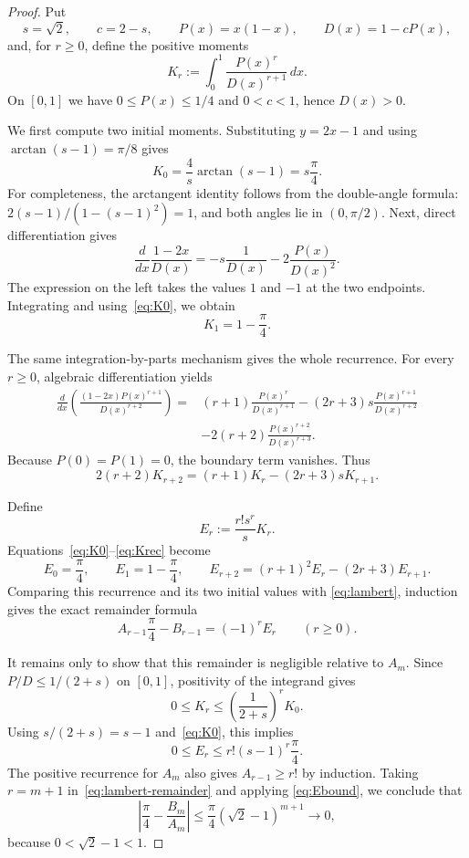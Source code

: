\documentclass[11pt]{article}
\theoremstyle{remark}
\begin{document}
\begin{proof}
Put
\[
s=\sqrt2,\qquad c=2-s,\qquad P(x)=x(1-x),\qquad D(x)=1-cP(x),
\]
and, for $r\ge0$, define the positive moments
\begin{equation}\label{eq:moment}
K_r:=\int_0^1\frac{P(x)^r}{D(x)^{r+1}}\,dx.
\end{equation}
On $[0,1]$ we have $0\le P(x)\le1/4$ and $0<c<1$, hence $D(x)>0$.

We first compute two initial moments. Substituting $y=2x-1$ and using
$\arctan(s-1)=\pi/8$ gives
\begin{equation}\label{eq:K0}
K_0=\frac4s\arctan(s-1)=s\frac{\pi}{4}.
\end{equation}
For completeness, the arctangent identity follows from the double-angle
formula: $2(s-1)/(1-(s-1)^2)=1$, and both angles lie in $(0,\pi/2)$.
Next, direct differentiation gives
\[
\frac{d}{dx}\frac{1-2x}{D(x)}
=-s\frac1{D(x)}-2\frac{P(x)}{D(x)^2}.
\]
The expression on the left takes the values $1$ and $-1$ at the two
endpoints. Integrating and using~\eqref{eq:K0}, we obtain
\begin{equation}\label{eq:K1}
K_1=1-\frac{\pi}{4}.
\end{equation}

The same integration-by-parts mechanism gives the whole recurrence. For every
$r\ge0$, algebraic differentiation yields
\begin{align*}
\frac{d}{dx}\left(
  \frac{(1-2x)P(x)^{r+1}}{D(x)^{r+2}}
\right)
={}&(r+1)\frac{P(x)^r}{D(x)^{r+1}}
 -(2r+3)s\frac{P(x)^{r+1}}{D(x)^{r+2}}\\
&-2(r+2)\frac{P(x)^{r+2}}{D(x)^{r+3}}.
\end{align*}
Because $P(0)=P(1)=0$, the boundary term vanishes. Thus
\begin{equation}\label{eq:Krec}
2(r+2)K_{r+2}=(r+1)K_r-(2r+3)sK_{r+1}.
\end{equation}

Define
\[
E_r:=\frac{r!s^r}{s}K_r.
\]
Equations~\eqref{eq:K0}--\eqref{eq:Krec} become
\[
E_0=\frac{\pi}{4},\qquad E_1=1-\frac{\pi}{4},\qquad
E_{r+2}=(r+1)^2E_r-(2r+3)E_{r+1}.
\]
Comparing this recurrence and its two initial values with
\eqref{eq:lambert}, induction gives the exact remainder formula
\begin{equation}\label{eq:lambert-remainder}
A_{r-1}\frac{\pi}{4}-B_{r-1}=(-1)^r E_r
\qquad(r\ge0).
\end{equation}

It remains only to show that this remainder is negligible relative to $A_m$.
Since $P/D\le1/(2+s)$ on $[0,1]$, positivity of the integrand gives
\[
0\le K_r\le \left(\frac1{2+s}\right)^rK_0.
\]
Using $s/(2+s)=s-1$ and~\eqref{eq:K0}, this implies
\begin{equation}\label{eq:Ebound}
0\le E_r\le r!(s-1)^r\frac{\pi}{4}.
\end{equation}
The positive recurrence for $A_m$ also gives $A_{r-1}\ge r!$ by induction.
Taking $r=m+1$ in~\eqref{eq:lambert-remainder} and applying
\eqref{eq:Ebound}, we conclude that
\[
\left|\frac{\pi}{4}-\frac{B_m}{A_m}\right|
\le \frac{\pi}{4}(\sqrt2-1)^{m+1}\longrightarrow0,
\]
because $0<\sqrt2-1<1$.
\end{proof}
\end{document}

